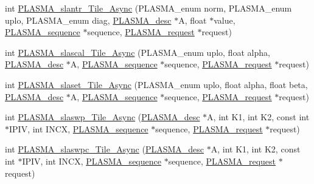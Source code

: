 \begin{DoxyCompactItemize}
\item 
int \hyperlink{group__float__Tile__Async_ga7324fd090f464276de6c8e4aee11d4bb_ga7324fd090f464276de6c8e4aee11d4bb}{P\+L\+A\+S\+M\+A\+\_\+slantr\+\_\+\+Tile\+\_\+\+Async} (P\+L\+A\+S\+M\+A\+\_\+enum norm, P\+L\+A\+S\+M\+A\+\_\+enum uplo, P\+L\+A\+S\+M\+A\+\_\+enum diag, \hyperlink{structplasma__desc__t}{P\+L\+A\+S\+M\+A\+\_\+desc} $\ast$A, float $\ast$value, \hyperlink{structplasma__sequence__t}{P\+L\+A\+S\+M\+A\+\_\+sequence} $\ast$sequence, \hyperlink{structplasma__request__t}{P\+L\+A\+S\+M\+A\+\_\+request} $\ast$request)
\item 
int \hyperlink{group__float__Tile__Async_ga91e8f5e6684880fd6b77283a8a38806f_ga91e8f5e6684880fd6b77283a8a38806f}{P\+L\+A\+S\+M\+A\+\_\+slascal\+\_\+\+Tile\+\_\+\+Async} (P\+L\+A\+S\+M\+A\+\_\+enum uplo, float alpha, \hyperlink{structplasma__desc__t}{P\+L\+A\+S\+M\+A\+\_\+desc} $\ast$A, \hyperlink{structplasma__sequence__t}{P\+L\+A\+S\+M\+A\+\_\+sequence} $\ast$sequence, \hyperlink{structplasma__request__t}{P\+L\+A\+S\+M\+A\+\_\+request} $\ast$request)
\item 
int \hyperlink{group__float__Tile__Async_gac9ef7c897ceb63da77cd2491c202f6f8_gac9ef7c897ceb63da77cd2491c202f6f8}{P\+L\+A\+S\+M\+A\+\_\+slaset\+\_\+\+Tile\+\_\+\+Async} (P\+L\+A\+S\+M\+A\+\_\+enum uplo, float alpha, float beta, \hyperlink{structplasma__desc__t}{P\+L\+A\+S\+M\+A\+\_\+desc} $\ast$A, \hyperlink{structplasma__sequence__t}{P\+L\+A\+S\+M\+A\+\_\+sequence} $\ast$sequence, \hyperlink{structplasma__request__t}{P\+L\+A\+S\+M\+A\+\_\+request} $\ast$request)
\item 
int \hyperlink{group__float__Tile__Async_ga35e4c0888d047bfd6b299d0096fe189a_ga35e4c0888d047bfd6b299d0096fe189a}{P\+L\+A\+S\+M\+A\+\_\+slaswp\+\_\+\+Tile\+\_\+\+Async} (\hyperlink{structplasma__desc__t}{P\+L\+A\+S\+M\+A\+\_\+desc} $\ast$A, int K1, int K2, const int $\ast$I\+P\+I\+V, int I\+N\+C\+X, \hyperlink{structplasma__sequence__t}{P\+L\+A\+S\+M\+A\+\_\+sequence} $\ast$sequence, \hyperlink{structplasma__request__t}{P\+L\+A\+S\+M\+A\+\_\+request} $\ast$request)
\item 
int \hyperlink{group__float__Tile__Async_gaa1af4fe7c58a13fa70c1315ecbd72e95_gaa1af4fe7c58a13fa70c1315ecbd72e95}{P\+L\+A\+S\+M\+A\+\_\+slaswpc\+\_\+\+Tile\+\_\+\+Async} (\hyperlink{structplasma__desc__t}{P\+L\+A\+S\+M\+A\+\_\+desc} $\ast$A, int K1, int K2, const int $\ast$I\+P\+I\+V, int I\+N\+C\+X, \hyperlink{structplasma__sequence__t}{P\+L\+A\+S\+M\+A\+\_\+sequence} $\ast$sequence, \hyperlink{structplasma__request__t}{P\+L\+A\+S\+M\+A\+\_\+request} $\ast$request)

\end{DoxyCompactItemize}
